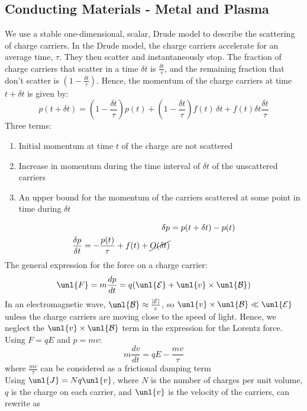 \documentclass[a4paper, 11pt, normalem]{report}
\renewcommand\E{\mathcal{E}}
\newcommand\uE{\unl{\E}}
\renewcommand\B{\mathcal{B}}
\newcommand\uB{\unl{\B}}
\newcommand\J{\unl{J}}
\begin{document}
\subsection{Conducting Materials - Metal and Plasma}
We use a stable one-dimensional, scalar, Drude model to describe the scattering of charge carriers.
In the Drude model, the charge carriers accelerate for an average time, $\tau$.
They then scatter and instantaneously stop.
The fraction of charge carriers that scatter in a time $\delta t$ is $\frac{\delta t}{\tau}$, and the remaining fraction that don't scatter is $\left(1 - \frac{\delta t}{\tau}\right)$.
Hence, the momentum of the charge carriers at time $t+\delta t$ is given by:
\begin{equation}
    p(t+\delta t) = \left(1 - \frac{\delta t}{\tau}\right)p(t) + \left(1 - \frac{\delta t}{\tau}\right)f(t)\,\delta t + f(t)\delta t \frac{\delta t}{\tau}
\end{equation}
Three terms:
\begin{enumerate}
    \item Initial momentum at time $t$ of the charge are not scattered
    \item Increase in momentum during the time interval of $\delta t$ of the unscattered carriers
    \item An upper bound for the momentum of the carriers scattered at some point in time during $\delta t$
\end{enumerate}
\begin{align}
    \delta p &= p(t+\delta t) - p(t) \\
    \frac{\delta p}{\delta t} = -\frac{p(t)}{\tau} + f(t) + \cancel{O(\delta t)}
\end{align}
The general expression for the force on a charge carrier:
\begin{equation}
    \unl{F} = m\frac{dp}{dt} = q(\uE + \unl{v}\times\uB)
\end{equation}
In an electromagnetic wave, $\uB \approx \frac{|\E|}{c}$, so $\unl{v}\times\uB \ll \uE$ unless the charge carriers are moving close to the speed of light.
Hence, we neglect the $\unl{v}\times\uB$ term in the expression for the Lorentz force.
Using $F = qE$ and $p = mv$:
\begin{equation}
    m\frac{dv}{dt} = qE - \frac{mv}{\tau} \tag{Equation of Motion}
\end{equation}
where $\frac{mv}{\tau}$ can be considered as a frictional damping term \\
Using $\J = Nq\unl{v}$, where $N$ is the number of charges per unit volume, $q$ is the charge on each carrier, and $\unl{v}$ is the velocity of the carriers, can rewrite as
\end{document}
